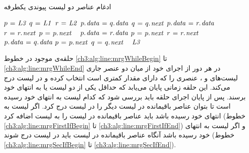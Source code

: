 \begin{algorithm}
\caption{ادغام عناصر دو لیست پیوندی یکطرفه}\label{ch3:alg:merge}
\begin{latin}
\begin{algorithmic}[1]
			\State	{}
			\State	$p \mathrel{\hspace{1pt}=\hspace{1pt}} \mathit{L3}$		
			\State	$q \mathrel{\hspace{1pt}=\hspace{1pt}} \mathit{L1}$
			\State	$r \mathrel{\hspace{1pt}=\hspace{1pt}} \mathit{L2}$	
			\label{ch3:alg:line:mrgWhileBegin}
					\State	{}
							\State	$p.\hspace*{1pt}\mathit{data} \mathrel{\hspace{1pt}=\hspace{1pt}} q.\hspace*{1pt}\mathit{data}$
							\State	$q \mathrel{\hspace{1pt}=\hspace{1pt}} q.\hspace*{1pt}\mathit{next}$
					\Else
							\State	$p.\hspace*{1pt}\mathit{data} \mathrel{\hspace{1pt}=\hspace{1pt}} r.\hspace*{1pt}\mathit{data}$
							\State	$r \mathrel{\hspace{1pt}=\hspace{1pt}} r.\hspace*{1pt}\mathit{next}$								
					\EndIf
					\State	$p \mathrel{\hspace{1pt}=\hspace{1pt}} p.\hspace*{1pt}\mathit{next}$
			\EndWhile\ \label{ch3:alg:line:mrgWhileEnd}
			\label{ch3:alg:line:mrgFirstIfBegin}
							\State	$p.\hspace*{1pt}\mathit{data} \mathrel{\hspace{1pt}=\hspace{1pt}} r.\hspace*{1pt}\mathit{data}$
									\State	\bcall{New}{$\attrib{p}{next}$}
									\State	$p \mathrel{\hspace{1pt}=\hspace{1pt}} p.\hspace*{1pt}\mathit{next}$
							\EndIf
							\State	$r \mathrel{\hspace{1pt}=\hspace{1pt}} r.\hspace*{1pt}\mathit{next}$
					\EndWhile
			\EndIf\ \label{ch3:alg:line:mrgFirstIfEnd}
			\label{ch3:alg:line:mrgSecIfBegin}
					\While{$q \neq \const{null}$}
							\State	$p.\hspace*{1pt}\mathit{data} \mathrel{\hspace{1pt}=\hspace{1pt}} q.\hspace*{1pt}\mathit{data}$
							\If{$\attrib{q}{next} \neq \const{null}$}
									\State	{}
									\State	$p \mathrel{\hspace{1pt}=\hspace{1pt}} p.\hspace*{1pt}\mathit{next}$
							\EndIf
							\State	$q \mathrel{\hspace{1pt}=\hspace{1pt}} q.\hspace*{1pt}\mathit{next}$
					\EndWhile
			\EndIf\ \label{ch3:alg:line:mrgSecIfEnd}	
		\State	\Return $\mathit{L3}$
\EndFunction
\end{algorithmic}
\end{latin}
\end{algorithm}

حلقه‌ی {} موجود در خطوط {\ref{ch3:alg:line:mrgWhileBegin}} تا {\ref{ch3:alg:line:mrgWhileEnd}} در هر دور از اجرای خود از میان دو عنصر جاری لیست‌های {} و {}، عنصری را که دارای مقدار کمتری است انتخاب کرده و در لیست {} درج می‌کند. این حلقه زمانی پایان می‌یابد که حداقل یکی از دو لیست {} یا {} به انتهای خود برسند. پس از پایان اجرای حلقه باید بررسی شود که کدام لیست به انتهای خود رسیده است تا بتوان عناصر باقیمانده در لیست دیگر را در لیست {} درج کرد. اگر لیست {} به انتهای خود رسیده باشد باید عناصر باقیمانده در لیست {} را به لیست {} اضافه کرد (خطوط {\ref{ch3:alg:line:mrgFirstIfBegin}} تا {\ref{ch3:alg:line:mrgFirstIfEnd}}) و اگر لیست {} به انتهای خود رسیده باشد آنگاه عناصر باقیمانده در لیست {} باید در لیست {} درج شوند (خطوط {\ref{ch3:alg:line:mrgSecIfBegin}} تا {\ref{ch3:alg:line:mrgSecIfEnd}}).

